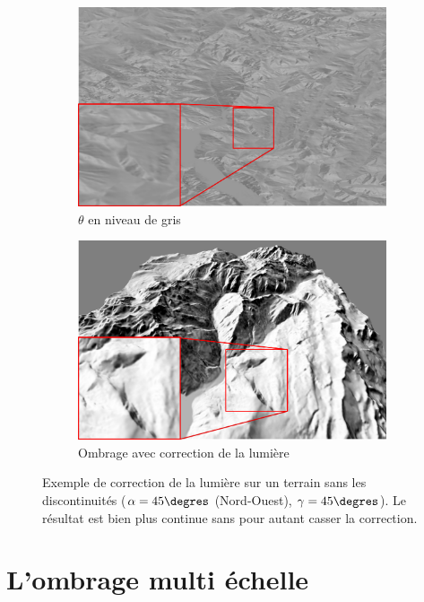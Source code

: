 \begin{figure}[h!]
\centering
 \begin{subfigure}[t]{0.47\textwidth}
 \centering
 \includegraphics[width=1.0\linewidth]{Solution/theta_continu.png}
 \caption{$\theta$ en niveau de gris}
 \end{subfigure}
 \begin{subfigure}[t]{0.47\textwidth}
 \centering
 \includegraphics[width=1.0\linewidth]{Solution/ombrage_continue.png}
 \caption{Ombrage avec correction de la lumière}
 \end{subfigure}
 \caption{\label{fig:shadingContinu}Exemple de correction de la lumière sur un terrain sans les discontinuités ($\alpha =  45\degres$ (Nord-Ouest), $\gamma = 45\degres$). Le résultat est bien plus continue sans pour autant casser la correction.}
\end{figure}


\section{L'ombrage multi échelle}


